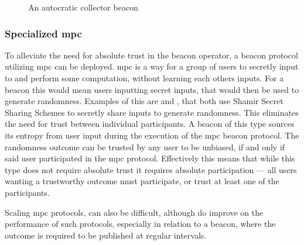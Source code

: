 \begin{figure}[htb]
    \centering
    \footnotesize
    \caption{An autocratic collector beacon}\label{fig:autocratic_beacon}
\end{figure}


\subsubsection{Specialized \gls{mpc}}\label{ssub:specialized_mpc}
To alleviate the need for absolute trust in the beacon operator, a beacon protocol utilizing \acrfull{mpc} \cite{goldreich1998secure} can be deployed. \gls{mpc} is a way for a group of users to secretly input to and perform some computation, without learning each others inputs. For a beacon this would mean users inputting secret inputs, that would then be used to generate randomness. Examples of this are  and , that both use Shamir Secret Sharing Schemes to secretly share inputs to generate randomness.  
This eliminates the need for trust between individual participants.
A beacon of this type sources its entropy from user input during the execution of the \gls{mpc} beacon protocol.
The randomness outcome can be trusted by any user to be unbiased, if and only if said user participated in the \gls{mpc} protocol.
Effectively this means that while this type does not require absolute trust it requires absolute participation --- all users wanting a trustworthy outcome must participate, or trust at least one of the participants. 


Scaling \gls{mpc} protocols, can also be difficult, although  do improve on the performance of such protocols, especially in relation to a beacon, where the outcome is required to be published at regular intervals.

